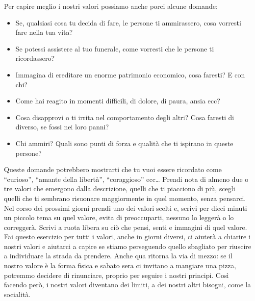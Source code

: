 \documentclass[12pt]{book} %
\begin{document}
Per capire meglio i nostri valori possiamo anche porci alcune domande:

\begin{itemize}
\item Se, qualsiasi cosa tu decida di fare, le persone ti ammirassero, cosa vorresti fare nella tua vita?
\item Se potessi assistere al tuo funerale, come vorresti che le persone ti ricordassero?
\item Immagina di ereditare un enorme patrimonio economico, cosa faresti? E con chi?
\item Come hai reagito in momenti difficili, di dolore, di paura, ansia ecc?
\item Cosa disapprovi o ti irrita nel comportamento degli altri? Cosa faresti di diverso, se fossi nei loro panni?
\item Chi ammiri? Quali sono punti di forza e qualità che ti ispirano in queste persone?
\end{itemize}

Queste domande potrebbero mostrarti che tu vuoi essere ricordato come “curioso”, “amante della libertà”, “coraggioso” ecc… 
Prendi nota di almeno due o tre valori che emergono dalla descrizione, quelli che ti piacciono di più,
scegli quelli che ti sembrano risuonare maggiormente in quel momento, senza pensarci. Nel corso dei prossimi giorni
prendi uno dei valori scelti e, scrivi per dieci minuti un piccolo tema su quel valore, evita di preoccuparti, nessuno
lo leggerà o lo correggerà. Scrivi a ruota libera su ciò che pensi, senti e immagini di quel valore. Fai questo
esercizio per tutti i valori, anche in giorni diversi, ci aiuterà a chiarire i nostri valori e aiutarci a capire se
stiamo perseguendo quello sbagliato per riuscire a individuare la strada da prendere. Anche qua ritorna la via di
mezzo: se il nostro valore è la forma fisica e sabato sera ci invitano a mangiare una pizza, potremmo decidere di
rinunciare, proprio per seguire i nostri principi. Così facendo però, i nostri valori diventano dei limiti, a dei
nostri altri bisogni, come la socialità.
\end{document}
